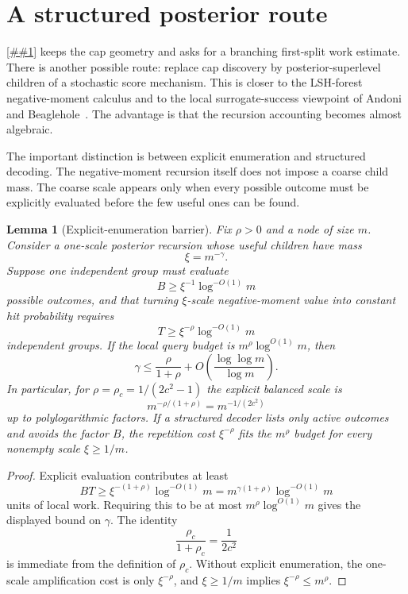\documentclass[10pt]{article}
\newcommand{\Cref}[1]{\ref{##1}}
\newtheorem{lemma}[theorem]{Lemma}
\theoremstyle{definition}
\begin{document}
\section{A structured posterior route}

\Cref{prop:randomized-polylog} keeps the cap geometry and asks for a branching first-split work estimate. There is another possible route: replace cap discovery by posterior-superlevel children of a stochastic score mechanism. This is closer to the LSH-forest negative-moment calculus and to the local surrogate-success viewpoint of Andoni and Beaglehole~\cite{AB22}. The advantage is that the recursion accounting becomes almost algebraic.

The important distinction is between explicit enumeration and structured decoding. The negative-moment recursion itself does not impose a coarse child mass. The coarse scale appears only when every possible outcome must be explicitly evaluated before the few useful ones can be found.

\begin{lemma}[Explicit-enumeration barrier]\label{lem:explicit-enumeration-barrier}
   Fix $\rho>0$ and a node of size $m$. Consider a one-scale posterior recursion whose useful children have mass
   \[
      \xi=m^{-\gamma}.
   \]
   Suppose one independent group must evaluate
   \[
      B\ge \xi^{-1}\log^{-O(1)}m
   \]
   possible outcomes, and that turning $\xi$-scale negative-moment value into constant hit probability requires
   \[
      T\ge \xi^{-\rho}\log^{-O(1)}m
   \]
   independent groups. If the local query budget is $m^\rho\log^{O(1)}m$, then
   \[
      \gamma\le \frac{\rho}{1+\rho}+O\!\left(\frac{\log\log m}{\log m}\right).
   \]
   In particular, for $\rho=\rho_c=1/(2c^2-1)$ the explicit balanced scale is
   \[
      m^{-\rho/(1+\rho)}=m^{-1/(2c^2)}
   \]
   up to polylogarithmic factors. If a structured decoder lists only active outcomes and avoids the factor $B$, the repetition cost $\xi^{-\rho}$ fits the $m^\rho$ budget for every nonempty scale $\xi\ge1/m$.
\end{lemma}

\begin{proof}
   Explicit evaluation contributes at least
   \[
      BT\ge \xi^{-(1+\rho)}\log^{-O(1)}m
      =
      m^{\gamma(1+\rho)}\log^{-O(1)}m
   \]
   units of local work. Requiring this to be at most $m^\rho\log^{O(1)}m$ gives the displayed bound on $\gamma$. The identity
   \[
      \frac{\rho_c}{1+\rho_c}=\frac1{2c^2}
   \]
   is immediate from the definition of $\rho_c$. Without explicit enumeration, the one-scale amplification cost is only $\xi^{-\rho}$, and $\xi\ge1/m$ implies $\xi^{-\rho}\le m^\rho$.
\end{proof}
\end{document}
